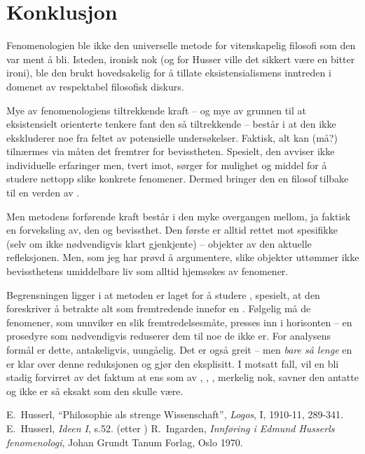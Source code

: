 \section{Konklusjon}
Fenomenologien ble ikke den universelle metode for vitenskapelig 
filosofi som den var ment {\aa} bli. Isteden, ironisk nok (og for 
Husser ville det sikkert v{\ae}re en bitter ironi), ble den brukt 
hovedsakelig for {\aa} tillate eksistensialismens inntreden i domenet 
av respektabel filosofisk diskurs. 

Mye av fenomenologiens tiltrekkende kraft -- og mye av grunnen til at 
eksistensielt orienterte tenkere fant den s{\aa} tiltrekkende -- 
best{\aa}r i at den ikke ekskluderer noe fra feltet av potensielle 
unders{\o}kelser. Faktisk, alt kan (m{\aa}?) tiln{\ae}rmes via 
m{\aa}ten det fremtrer for bevisstheten. Spesielt, den avviser ikke 
individuelle erfaringer men, tvert imot, s{\o}rger for 
mulighet og middel for {\aa} studere nettopp slike konkrete 
fenomener. Dermed bringer den en filosof tilbake til en verden av 
.

Men metodens forf{\o}rende kraft best{\aa}r i den myke overgangen 
mellom, ja faktisk en forveksling av, den  og 
 bevissthet. Den f{\o}rste er alltid rettet mot 
spesifikke (selv om ikke n{\o}dvendigvis klart gjenkjente)  -- objekter av den aktuelle refleksjonen. Men, som jeg har 
pr{\o}vd {\aa} argumentere, slike objekter utt{\o}mmer ikke 
bevissthetens umiddelbare liv som alltid hjems{\o}kes av 
 fenomener.

Begrensningen ligger i at metoden er laget for {\aa} studere 
, spesielt, at den foreskriver {\aa} betrakte alt som 
 fremtredende innefor en
. F{\o}lgelig m{\aa} de 
 fenomener, som unnviker en slik 
fremtredelsesm{\aa}te, presses inn i horisonten -- en prosedyre 
som n{\o}dvendigvis reduserer dem til noe de ikke er. For analysens 
form{\aa}l er dette, antakeligvis, uung{\aa}elig.  Det er ogs{\aa} 
greit -- men {\em bare s{\aa} lenge} en er klar over denne reduksjonen 
og gj{\o}r den eksplisitt. I motsatt fall, vil en bli stadig forvirret 
av det faktum at ens  som 
  av , , 
, merkelig nok, savner den antatte  
og ikke er s{\aa} eksakt som den skulle v{\ae}re.

\begin{thebibliography}{SU}
 E.~Husserl, ``Philosophie als strenge Wissenschaft'', 
{\em Logos}, I, 
1910-11, 289-341. %
 E.~Husserl, {\em Ideen I}, s.52. 
   (etter \cite{RI})
 R.~Ingarden, {\em Innf{\o}ring i Edmund Husserls fenomenologi}, 
   Johan Grundt Tanum Forlag, Oslo 1970.
\end{thebibliography}



